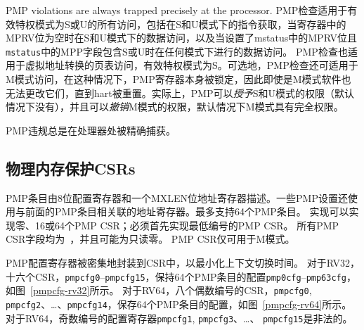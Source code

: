 {PMP violations are always trapped precisely at the processor.
\fi
PMP检查适用于有效特权模式为S或U的所有访问，包括在S和U模式下的指令获取，当寄存器中的MPRV位为空时在S和U模式下的数据访问，以及当设置了mstatus中的MPRV位且{\tt mstatus}中的MPP字段包含S或U时在任何模式下进行的数据访问。
PMP检查也适用于虚拟地址转换的页表访问，有效特权模式为S。可选地，PMP检查还可适用于M模式访问，在这种情况下，PMP寄存器本身被锁定，因此即使是M模式软件也无法更改它们，直到hart被重置。实际上，PMP可以{\em 授予}S和U模式的权限（默认情况下没有），并且可以{\em 撤销}M模式的权限，默认情况下M模式具有完全权限。

PMP违规总是在处理器处被精确捕获。

\subsection{物理内存保护CSRs}

\iffalse
PMP entries are described by an 8-bit configuration register and one MXLEN-bit
address register.  Some PMP settings additionally use the address register
associated with the preceding PMP entry.
Up to 64 PMP entries are supported.
Implementations may implement zero, 16, or 64 PMP CSRs; the lowest-numbered
PMP CSRs must be implemented first.
All PMP CSR fields are \warl\ and may be read-only zero.
PMP CSRs are only accessible to M-mode.
\fi
PMP条目由8位配置寄存器和一个MXLEN位地址寄存器描述。一些PMP设置还使用与前面的PMP条目相关联的地址寄存器。最多支持64个PMP条目。
实现可以实现零、16或64个PMP CSR；必须首先实现最低编号的PMP CSR。
所有PMP CSR字段均为\warl\ ，并且可能为只读零。
PMP CSR仅可用于M模式。

\iffalse
The PMP configuration registers are densely packed into CSRs to minimize
context-switch time.
For RV32, sixteen CSRs, {\tt pmpcfg0}--{\tt pmpcfg15}, hold the configurations
{\tt pmp0cfg}--{\tt pmp63cfg} for the 64 PMP entries, as shown in
Figure~\ref{pmpcfg-rv32}.
For RV64, eight even-numbered CSRs,
{\tt pmpcfg0}, {\tt pmpcfg2}, \ldots, {\tt pmpcfg14}, hold the configurations
for the 64 PMP entries, as shown in Figure~\ref{pmpcfg-rv64}.
For RV64, the odd-numbered configuration registers,
{\tt pmpcfg1}, {\tt pmpcfg3}, \ldots, {\tt pmpcfg15}, are illegal.
\fi
PMP配置寄存器被密集地封装到CSR中，以最小化上下文切换时间。
对于RV32，十六个CSR，{\tt pmpcfg0}--{\tt pmpcfg15}，保持64个PMP条目的配置{\tt pmp0cfg}--{\tt pmp63cfg}，如图~\ref{pmpcfg-rv32}所示。
对于RV64，八个偶数编号的CSR，{\tt pmpcfg0}, {\tt pmpcfg2}、\ldots、{\tt pmpcfg14}，保存64个PMP条目的配置，如图~\ref{pmpcfg-rv64}所示。
对于RV64，奇数编号的配置寄存器{\tt pmpcfg1}, {\tt pmpcfg3}、\ldots、 {\tt pmpcfg15}是非法的。

}
